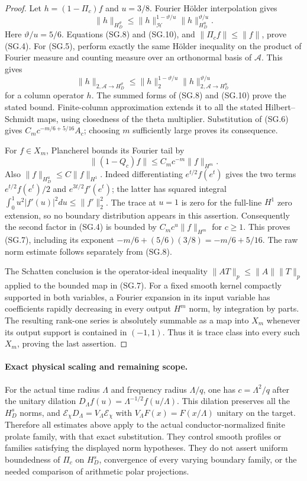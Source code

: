 \begin{proof}
Let $h=(1-\Pi_c)f$ and $u=3/8$.
Fourier H\"older interpolation gives
\[
 \|h\|_{H_D^{\vartheta}}
       \leq\|h\|_{\mathcal H}^{1-\vartheta/u}
                           \|h\|_{H_D^u}^{\vartheta/u}.
                                                               \tag{SG.13}
\]
Here $\vartheta/u=5/6$.
Equations (SG.8) and (SG.10), and
$\|\Pi_cf\|\leq\|f\|$, prove (SG.4).
For (SG.5), perform exactly the same H\"older inequality
on the product of Fourier measure and counting measure
over an orthonormal basis of $\mathcal A$.
This gives
\[
 \|h\|_{2,\mathcal A\to H_D^{\vartheta}}
 \leq\|h\|_2^{1-\vartheta/u}
                     \|h\|_{2,\mathcal A\to H_D^u}^{\vartheta/u}
\]
for a column operator $h$.
The summed forms of (SG.8) and (SG.10) prove the
stated bound.  Finite-column approximation extends it
to all the stated Hilbert--Schmidt maps, using
closedness of the theta multiplier.
Substitution of (SG.6) gives
$C_m c^{-m/6+5/16}A_c$; choosing $m$ sufficiently
large proves its consequence.

For $f\in X_m$, Plancherel bounds its Fourier tail by
\[
       \|(1-Q_c)f\|\leq C_m c^{-m}\|f\|_{H^m}.
\]
Also $\|f\|_{H_D^u}\leq C\|f\|_{H^1}$.
Indeed differentiating $e^{t/2}f(e^t)$ gives the
two terms $e^{t/2}f(e^t)/2$ and $e^{3t/2}f'(e^t)$;
the latter has squared integral
$\int_0^1u^2|f'(u)|^2du\leq\|f'\|_2^2$.
The trace at $u=1$ is zero for the full-line
$H^1$ zero extension, so no boundary distribution
appears in this assertion.
Consequently the second factor in (SG.4) is bounded
by $C_m c^u\|f\|_{H^m}$ for $c\geq1$.
This proves (SG.7), including its exponent
$-m/6+(5/6)(3/8)=-m/6+5/16$.
The raw norm estimate follows separately from (SG.8).

The Schatten conclusion is the operator-ideal inequality
$\|AT\|_p\leq\|A\|\|T\|_p$ applied to the bounded map
in (SG.7).
For a fixed smooth kernel compactly supported in both
variables, a Fourier expansion in its input variable
has coefficients rapidly decreasing in every output
$H^m$ norm, by integration by parts.
The resulting rank-one series is absolutely summable
as a map into $X_m$ whenever its output support is
contained in $(-1,1)$.
Thus it is trace class into every such $X_m$, proving
the last assertion.
\end{proof}

\paragraph{Exact physical scaling and remaining scope.}
For the actual time radius $\Lambda$ and frequency radius
$\Lambda/q$, one has $c=\Lambda^2/q$ after the unitary
dilation $D_\Lambda f(u)=\Lambda^{-1/2}f(u/\Lambda)$.
This dilation preserves all the $H_D^s$ norms, and
$\mathcal E_\chi D_\Lambda=V_\Lambda\mathcal E_\chi$
with $V_\Lambda F(x)=F(x/\Lambda)$ unitary on the target.
Therefore all estimates above apply to the actual
conductor-normalized finite prolate family, with that
exact substitution.  They control smooth profiles or
families satisfying the displayed norm hypotheses.
They do not assert uniform boundedness of $\Pi_c$ on
$H_D^s$, convergence of every varying boundary family,
or the needed comparison of arithmetic polar projections.
